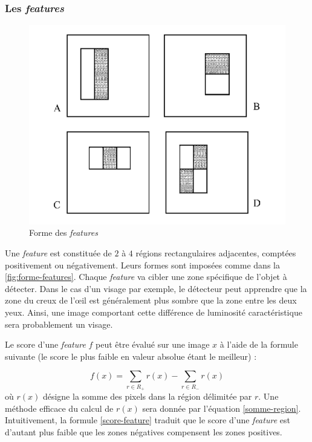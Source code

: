 \documentclass[12pt,a4paper]{article}
\begin{document}
\subsubsection{Les \textit{features}}

\begin{figure}
        \includegraphics[scale = 0.4]{forme_features}
        \centering
        \caption{Forme des \textit{features}}
        \label{fig:forme-features}
\end{figure}
    
Une \textit{feature} est constituée de $2$ à $4$ régions rectangulaires adjacentes, comptées positivement ou négativement. Leurs formes sont imposées comme dans la \autoref{fig:forme-features}. 
Chaque \textit{feature} va cibler une zone spécifique de l'objet à détecter. Dans le cas d'un visage par exemple, le détecteur peut apprendre que la zone du creux de l'œil est généralement plus sombre que la zone entre les deux yeux. Ainsi, une image comportant cette différence de luminosité caractéristique sera probablement un visage.


Le score d'une \textit{feature} $f$ peut être évalué sur une image $x$ à l'aide de la formule suivante (le score le plus faible en valeur absolue étant le meilleur) :

\begin{equation}\label{score-feature}
    f(x) = \sum_{r \in R_+} r(x) - \sum_{r \in R_-} r(x)
\end{equation}
où $r(x)$ désigne la somme des pixels dans la région délimitée par $r$. Une méthode efficace du calcul de $r(x)$ sera donnée par l'équation \ref{somme-region}. Intuitivement, la formule \ref{score-feature} traduit que le score d'une \textit{feature} est d'autant plus faible que les zones négatives compensent les zones positives.
\end{document}
